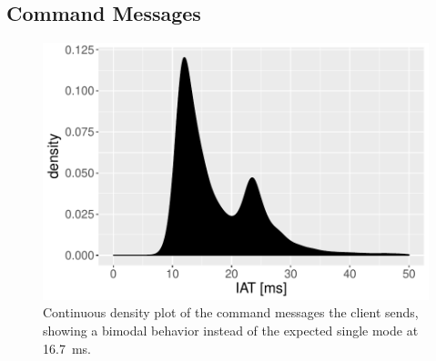 \subsection{Command Messages}

\begin{figure}[t]
	\centering
	\includegraphics[width=1.0\columnwidth]{images/command-density.pdf}
	\caption{Continuous density plot of the command messages the client sends, showing a bimodal behavior instead of the expected single mode at \SI{16.7}{\milli\second}.}
\label{fig:command-density}
\end{figure}

